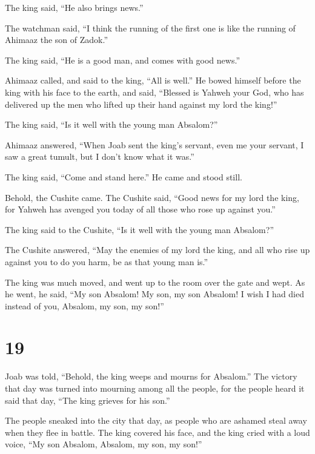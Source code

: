 The king said, ``He also brings news.''

 The watchman said, ``I think the running of the first
one is like the running of Ahimaaz the son of Zadok.''

The king said, ``He is a good man, and comes with good news.''

 Ahimaaz called, and said to the king, ``All is well.''
He bowed himself before the king with his face to the earth, and said,
``Blessed is Yahweh your God, who has delivered up the men who lifted up
their hand against my lord the king!''

 The king said, ``Is it well with the young man
Absalom?''

Ahimaaz answered, ``When Joab sent the king's servant, even me your
servant, I saw a great tumult, but I don't know what it was.''

 The king said, ``Come and stand here.'' He came and
stood still.

 Behold, the Cushite came. The Cushite said, ``Good news
for my lord the king, for Yahweh has avenged you today of all those who
rose up against you.''

 The king said to the Cushite, ``Is it well with the
young man Absalom?''

The Cushite answered, ``May the enemies of my lord the king, and all who
rise up against you to do you harm, be as that young man is.''

 The king was much moved, and went up to the room over
the gate and wept. As he went, he said, ``My son Absalom! My son, my son
Absalom! I wish I had died instead of you, Absalom, my son, my son!''

\hypertarget{section-18}{%
\section{19}\label{section-18}}

 Joab was told, ``Behold, the king weeps and mourns for
Absalom.''  The victory that day was turned into mourning
among all the people, for the people heard it said that day, ``The king
grieves for his son.''

 The people sneaked into the city that day, as people who
are ashamed steal away when they flee in battle.  The king
covered his face, and the king cried with a loud voice, ``My son
Absalom, Absalom, my son, my son!''

